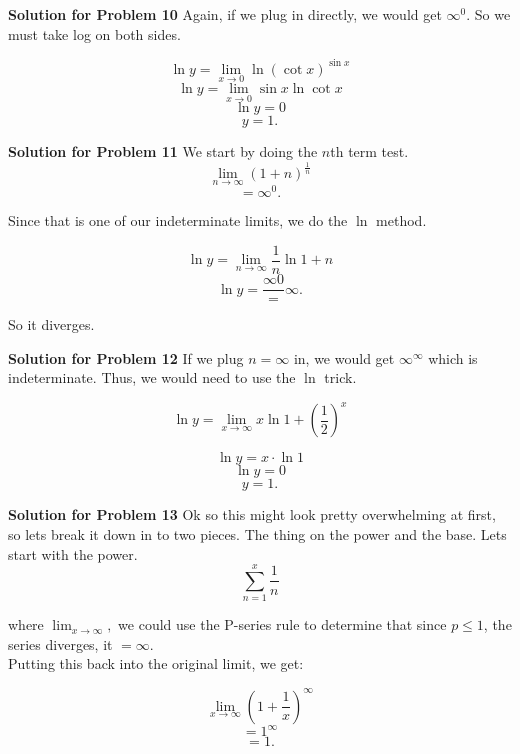 \documentclass{article}
\begin{document}
\vspace{1cm}



\textbf{Solution for Problem 10} Again, if we plug in directly, we would get $\infty^{0}$. So we must take log on both sides.

\[\ln{y} = \lim_{x \to 0} \ln{\left( \cot{x} \right)^{\sin{x}}}\]
\[\ln{y} = \lim_{x \to 0} \sin{x} \ln{\cot{x}}\]
\[\ln{y} = 0\]
\[y = \boxed{1}.\]

\vspace{1cm}



\textbf{Solution for Problem 11} We start by doing the $n$th term test.\\

\[\lim_{n \to \infty} \left( 1 + n \right)^{\frac {1} {n}}\]
\[= \infty^{0}.\]

Since that is one of our indeterminate limits, we do the $\ln$ method.

\[\ln{y} = \lim_{n \to \infty} \frac {1} {n} \ln{1 + n}\]
\[\ln{y} = \frac {\infty {0}} = \infty.\]

So it diverges.

\vspace{1cm}

\textbf{Solution for Problem 12} If we plug $n = \infty$ in, we would get $\infty^{\infty}$ which is indeterminate. Thus, we would need to use the $\ln$ trick.

\[\ln{y} = \lim_{x \to \infty} x\ln{1 + \left( \frac {1} {2} \right)^{x}}\]

\[\ln{y} = x \cdot \ln{1}\]
\[\ln{y} = 0\]
\[y = \boxed{1}.\]


\vspace{1cm}

\textbf{Solution for Problem 13} Ok so this might look pretty overwhelming at first, so lets break it down in to two pieces. The thing on the power and the base. Lets start with the power.\\

\[\sum_{n = 1}^{x} \frac {1} {n}\]

where $\lim_{x \to \infty},$ we could use the P-series rule to determine that since $p \le 1$, the series diverges, it $= \infty.$\\

Putting this back into the original limit, we get:

\[\displaystyle \lim_{x \to \infty} \left( 1 + \frac {1} {x} \right)^{\infty} \]
\[= 1^{\infty}\]
\[= \boxed{1}.\]
\end{document}
